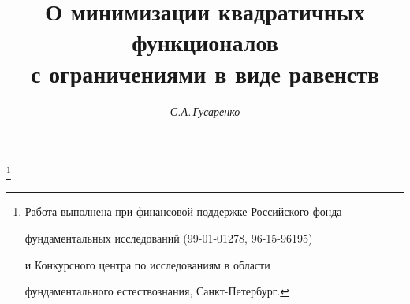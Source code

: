








\newcommand{\spc}[1]{\bold #1}


\newcommand{\eqdef}{\overset{\mathrm{def}}{=}{}}


\newcommand{\kr}{\operatorname{ker}}


\newcommand{\tts}[1]{}







\setcounter{page}{66}















\author{\it С.А.\,Гусаренко}




\title{О минимизации квадратичных функционалов\\


с ограничениями в виде равенств}


\thanks{Работа выполнена при финансовой поддержке Российского фонда


фундаментальных исследований (99-01-01278, 96-15-96195)


и Конкурсного центра по исследованиям в области


фундаментального естествознания, Санкт-Петербург.}





\date{}


